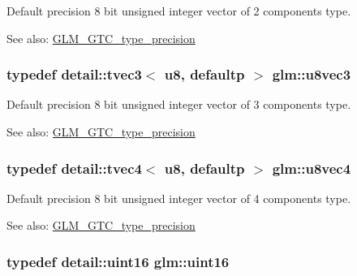 Default precision 8 bit unsigned integer vector of 2 components type. \begin{Desc}
\item[See also:]\hyperlink{group__gtc__type__precision}{GLM\_\-GTC\_\-type\_\-precision} \end{Desc}
\hypertarget{group__gtc__type__precision_g3b4624ecd0485fe5143f956864e7934e}{
\subsubsection[u8vec3]{\setlength{\rightskip}{0pt plus 5cm}typedef detail::tvec3$<$ u8, defaultp $>$ {\bf glm::u8vec3}}}
\label{group__gtc__type__precision_g3b4624ecd0485fe5143f956864e7934e}


Default precision 8 bit unsigned integer vector of 3 components type. \begin{Desc}
\item[See also:]\hyperlink{group__gtc__type__precision}{GLM\_\-GTC\_\-type\_\-precision} \end{Desc}
\hypertarget{group__gtc__type__precision_gaf6b3d127698d893de8652deedfd3d9b}{
\subsubsection[u8vec4]{\setlength{\rightskip}{0pt plus 5cm}typedef detail::tvec4$<$ u8, defaultp $>$ {\bf glm::u8vec4}}}
\label{group__gtc__type__precision_gaf6b3d127698d893de8652deedfd3d9b}


Default precision 8 bit unsigned integer vector of 4 components type. \begin{Desc}
\item[See also:]\hyperlink{group__gtc__type__precision}{GLM\_\-GTC\_\-type\_\-precision} \end{Desc}
\hypertarget{group__gtc__type__precision_gd8c2939e1fdd8e5828b31d95c52255d5}{
\subsubsection[uint16]{\setlength{\rightskip}{0pt plus 5cm}typedef detail::uint16 {\bf glm::uint16}}}
\label{group__gtc__type__precision_gd8c2939e1fdd8e5828b31d95c52255d5}


